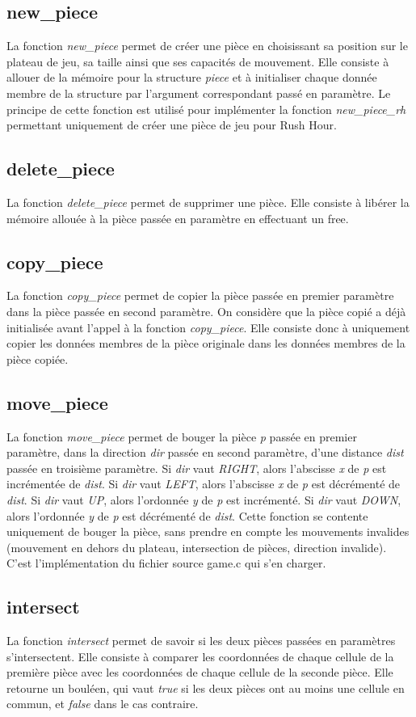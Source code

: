\documentclass{report}
\begin{document}
\subsection{new\_piece}
La fonction \emph{new\_piece} permet de créer une pièce en choisissant sa position sur le plateau de jeu, sa taille ainsi que ses capacités de mouvement. Elle consiste à allouer de la mémoire pour la structure \emph{piece} et à initialiser chaque donnée membre de la structure par l'argument correspondant passé en paramètre. Le principe de cette fonction est utilisé pour implémenter la fonction \emph{new\_piece\_rh} permettant uniquement de créer une pièce de jeu pour Rush Hour.
\subsection{delete\_piece}
La fonction \emph{delete\_piece} permet de supprimer une pièce. Elle consiste à libérer la mémoire allouée à la pièce passée en paramètre en effectuant un free.
\subsection{copy\_piece}
La fonction \emph{copy\_piece} permet de copier la pièce passée en premier paramètre dans la pièce passée en second paramètre. On considère que la pièce copié a déjà initialisée avant l'appel à la fonction \emph{copy\_piece}. Elle consiste donc à uniquement copier les données membres de la pièce originale dans les données membres de la pièce copiée. 
\subsection{move\_piece}
La fonction \emph{move\_piece} permet de bouger la pièce \emph{p} passée en premier paramètre, dans la direction \emph{dir} passée en second paramètre, d'une distance \emph{dist} passée en troisième paramètre. Si \emph{dir} vaut \emph{RIGHT}, alors l'abscisse \emph{x} de \emph{p} est incrémentée de \emph{dist}. Si \emph{dir} vaut \emph{LEFT}, alors l'abscisse \emph{x} de \emph{p} est décrémenté de \emph{dist}. Si \emph{dir} vaut \emph{UP}, alors l'ordonnée \emph{y} de \emph{p} est incrémenté. Si \emph{dir} vaut \emph{DOWN}, alors l'ordonnée \emph{y} de \emph{p} est décrémenté de \emph{dist}. Cette fonction se contente uniquement de bouger la pièce, sans prendre en compte les mouvements invalides (mouvement en dehors du plateau, intersection de pièces, direction invalide). C'est l'implémentation du fichier source game.c qui s'en charger.
\subsection{intersect}
La fonction \emph{intersect} permet de savoir si les deux pièces passées en paramètres s'intersectent. Elle consiste à comparer les coordonnées de chaque cellule de la première pièce avec les coordonnées de chaque cellule de la seconde pièce. Elle retourne un bouléen, qui vaut \emph{true} si les deux pièces ont au moins une cellule en commun, et \emph{false} dans le cas contraire.
\end{document}
